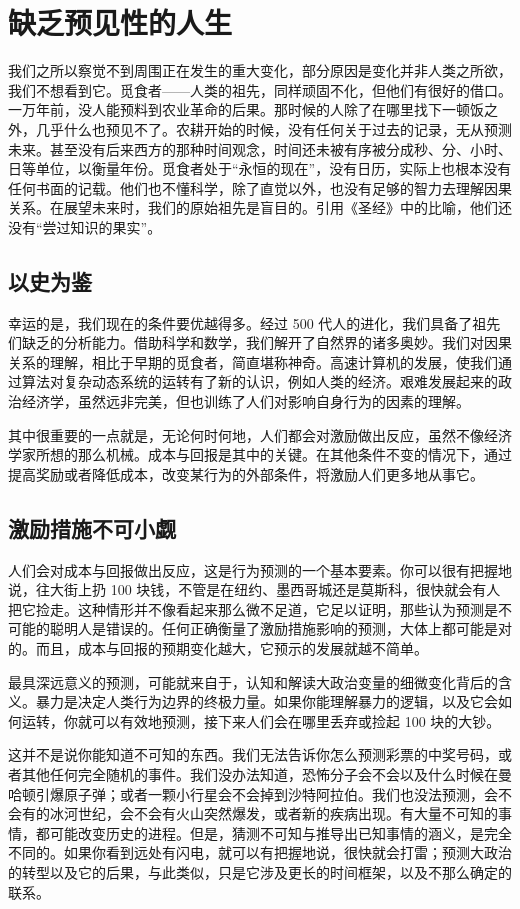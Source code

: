 \section{缺乏预见性的人生}
我们之所以察觉不到周围正在发生的重大变化，部分原因是变化并非人类之所欲，我们不想看到它。觅食者——人类的祖先，同样顽固不化，但他们有很好的借口。一万年前，没人能预料到农业革命的后果。那时候的人除了在哪里找下一顿饭之外，几乎什么也预见不了。农耕开始的时候，没有任何关于过去的记录，无从预测未来。甚至没有后来西方的那种时间观念，时间还未被有序被分成秒、分、小时、日等单位，以衡量年份。觅食者处于“永恒的现在”，没有日历，实际上也根本没有任何书面的记载。他们也不懂科学，除了直觉以外，也没有足够的智力去理解因果关系。在展望未来时，我们的原始祖先是盲目的。引用《圣经》中的比喻，他们还没有“尝过知识的果实”。

\subsection{以史为鉴}
幸运的是，我们现在的条件要优越得多。经过 500 代人的进化，我们具备了祖先们缺乏的分析能力。借助科学和数学，我们解开了自然界的诸多奥妙。我们对因果关系的理解，相比于早期的觅食者，简直堪称神奇。高速计算机的发展，使我们通过算法对复杂动态系统的运转有了新的认识，例如人类的经济。艰难发展起来的政治经济学，虽然远非完美，但也训练了人们对影响自身行为的因素的理解。

其中很重要的一点就是，无论何时何地，人们都会对激励做出反应，虽然不像经济学家所想的那么机械。成本与回报是其中的关键。在其他条件不变的情况下，通过提高奖励或者降低成本，改变某行为的外部条件，将激励人们更多地从事它。

\subsection{激励措施不可小觑}
人们会对成本与回报做出反应，这是行为预测的一个基本要素。你可以很有把握地说，往大街上扔 100 块钱，不管是在纽约、墨西哥城还是莫斯科，很快就会有人把它捡走。这种情形并不像看起来那么微不足道，它足以证明，那些认为预测是不可能的聪明人是错误的。任何正确衡量了激励措施影响的预测，大体上都可能是对的。而且，成本与回报的预期变化越大，它预示的发展就越不简单。

最具深远意义的预测，可能就来自于，认知和解读大政治变量的细微变化背后的含义。暴力是决定人类行为边界的终极力量。如果你能理解暴力的逻辑，以及它会如何运转，你就可以有效地预测，接下来人们会在哪里丢弃或捡起 100 块的大钞。

这并不是说你能知道不可知的东西。我们无法告诉你怎么预测彩票的中奖号码，或者其他任何完全随机的事件。我们没办法知道，恐怖分子会不会以及什么时候在曼哈顿引爆原子弹；或者一颗小行星会不会掉到沙特阿拉伯。我们也没法预测，会不会有的冰河世纪，会不会有火山突然爆发，或者新的疾病出现。有大量不可知的事情，都可能改变历史的进程。但是，猜测不可知与推导出已知事情的涵义，是完全不同的。如果你看到远处有闪电，就可以有把握地说，很快就会打雷；预测大政治的转型以及它的后果，与此类似，只是它涉及更长的时间框架，以及不那么确定的联系。

